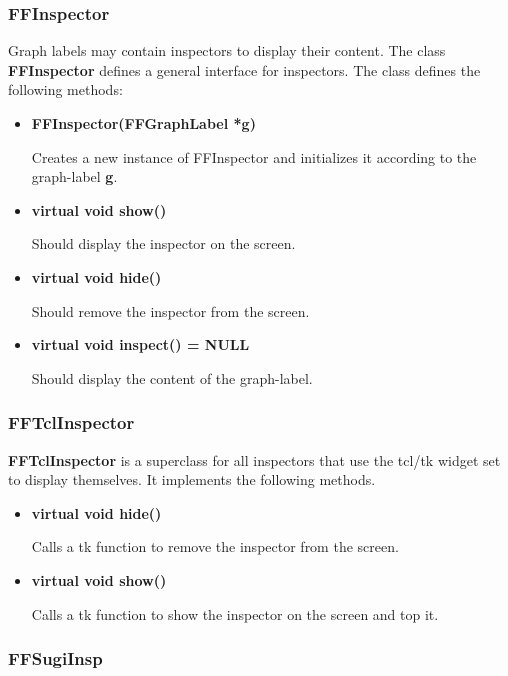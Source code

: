 \subsubsection{FFInspector}

Graph labels may contain inspectors to display their content. The
class {\bf FFInspector} defines a general interface for
inspectors. The class defines the following methods:

\begin{itemize}

\item{\bf FFInspector(FFGraphLabel *g)}

Creates a new instance of FFInspector and initializes it according to
the graph-label {\bf g}.

\item{\bf virtual void show()}

Should display the inspector on the screen.

\item{\bf virtual void hide()}

Should remove the inspector from the screen.

\item{\bf virtual void inspect() = NULL}

Should display the content of the graph-label.

\end{itemize}

\subsubsection{FFTclInspector}

{\bf FFTclInspector} is a superclass for all inspectors that use the
tcl/tk widget set to display themselves. It implements the following
methods.

\begin{itemize}

\item{\bf virtual void hide()}

Calls a tk function to remove the inspector from the screen.

\item{\bf virtual void show()}

Calls a tk function to show the inspector on the screen and top it.

\end{itemize}

\subsubsection{FFSugiInsp}

